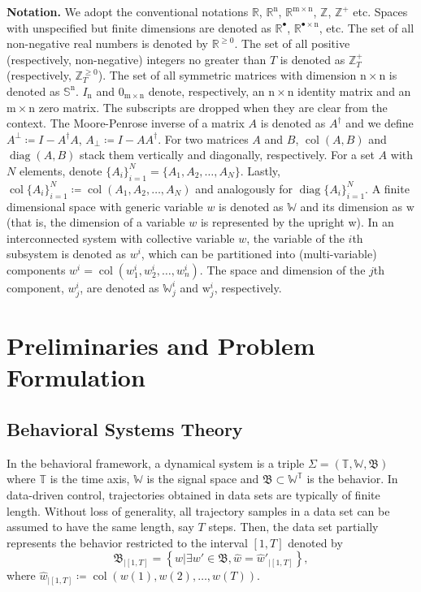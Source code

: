 \documentclass[11pt,print,draftcls,onecolumn,romanappendices]{ieeecolor}
\DeclareMathOperator{\col}{col}
\DeclareMathOperator{\diag}{diag}
\newcommand{\W}{\mathbb{W}}
\newcommand{\T}{\mathbb{T}}
\newcommand{\R}{\mathbb{R}}
\newcommand{\Z}{\mathbb{Z}}
\newcommand{\Zp}[1]{\mathbb{Z}^+_{#1}}
\newcommand{\Znn}[1]{\mathbb{Z}^{\geq0}_{#1}}
\newcommand{\revise}[1]{{\color{black} #1}}
\newcommand{\B}{\mathfrak{B}}
\newcommand{\bint}[1]{{|[#1]}}
\begin{document}
\textbf{Notation.} We adopt the conventional notations $\R$, $\R^\mathrm{n}$, $\R^{\mathrm{m}\times \mathrm{n}}$, $\Z$, $\Zp{}$ etc. Spaces with unspecified but finite dimensions are denoted as $\R^\bullet$, $\R^{\bullet\times \mathrm{n}}$, etc. The set of all non-negative real numbers is denoted by $\R^{\geq0}$. The set of all positive (respectively, non-negative) integers no greater than $T$ is denoted as $\Zp{T}$ (respectively, $\Znn{T}$). The set of all symmetric matrices with dimension $\mathrm{n}\times\mathrm{n}$ is denoted as $\mathbb{S}^\mathrm{n}$. $I_\mathrm{n}$ and $0_{\mathrm{m}\times \mathrm{n}}$ denote, respectively, an $\mathrm{n}\times \mathrm{n}$ identity matrix and an $\mathrm{m}\times \mathrm{n}$ zero matrix. The subscripts are dropped when they are clear from the context. The Moore-Penrose inverse of a matrix $A$ is denoted as $A^\dagger$ and \revise{we} define $A^\perp\coloneqq I-A^\dagger A$, $A_\perp\coloneqq I-AA^\dagger$. For two matrices $A$ and $B$, $\col(A,B)$ and $\diag(A,B)$ stack them vertically and diagonally, respectively. For a set $A$ with $N$ elements, denote $\{A_i\}_{i=1}^N=\{A_1,A_2,\ldots,A_N\}$. Lastly, $\col\{A_i\}_{i=1}^N\coloneqq\col(A_1,A_2,\ldots,A_N)$ and analogously for $\diag\{A_i\}_{i=1}^N$. \revise{A finite dimensional space with generic variable $w$ is denoted as $\W$ and its dimension as $\mathrm{w}$} (that is, the dimension of a variable $w$ is represented by the upright w). \revise{In an interconnected system with collective variable $w$, the variable of the $i$th subsystem is denoted as $w^i$, which can be partitioned into (multi-variable) components $w^i=\col(w_1^i,w_2^i,\ldots,w_n^i)$. The space and dimension of the $j$th component, $w_j^i$, are denoted as $\mathbb{W}_j^i$ and $\mathrm{w}_j^i$, respectively.}

\section{Preliminaries and Problem Formulation}\label{sec:preliminaries}
\subsection{Behavioral Systems Theory}
In \revise{the} behavioral framework, a dynamical system is a triple $\Sigma=(\T,\W,\B)$ where $\T$ is the time axis, $\W$ is the signal space and $\B\subset\W^\T$ is the behavior. In data-driven control, trajectories obtained in data sets are typically of finite length. Without loss of generality, all trajectory samples in a data set can be assumed to have the same length, say $T$ steps. Then, the data set partially represents the behavior restricted to the interval $[1,T]$ denoted by
\begin{equation}
	\B_\bint{1,T}=\left\{w|\exists w'\in\B, \hat{w}=\hat{w}'_\bint{1,T}\right\},
\end{equation}
where $\hat{w}_\bint{1,T}\coloneqq\col(w(1),w(2),\ldots,w(T))$.
\end{document}
